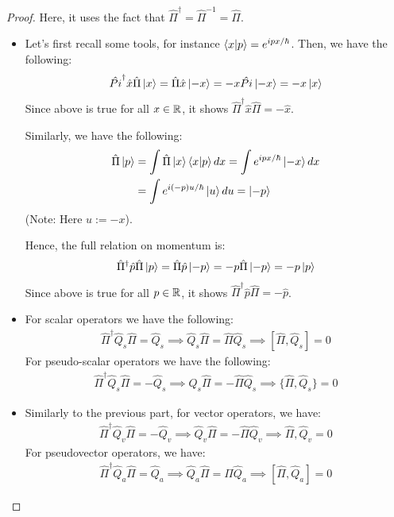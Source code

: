 \documentclass{article}
\begin{document}
\begin{proof}
    Here, it uses the fact that $\hat{\Pi}^\dagger=\hat{\Pi}^{-1}=\hat{\Pi}$.

    \hfil

    \begin{itemize}
        \item[(a)] Let's first recall some tools, for instance $\braket{x}{p}=e^{ipx/\hbar}$. Then, we have the following:
        \begin{align}
            \hat{Pi}^\dagger \hat{x} \hat{\Pi} \ket{x} = \hat{\Pi}\hat{x}\ket{-x} = -x\hat{Pi}\ket{-x} = -x\ket{x}
        \end{align}
        Since above is true for all $x\in\mathbb{R}$, it shows $\hat{\Pi}^\dagger\hat{x}\hat{\Pi}=-\hat{x}$.

        Similarly, we have the following:
        \begin{align}
            \hat{\Pi}\ket{p} &= \int \hat{\Pi}\ket{x}\braket{x}{p}dx = \int e^{ipx/\hbar}\ket{-x}dx\\
            &= \int e^{i(-p)u/\hbar}\ket{u}du = \ket{-p}
        \end{align}
        (Note: Here $u:=-x$).

        Hence, the full relation on momentum is:
        \begin{align}
            \hat{\Pi}^\dagger\hat{p}\hat{\Pi}\ket{p} = \hat{\Pi}\hat{p}\ket{-p} = -p\hat{\Pi}\ket{-p} = -p\ket{p}
        \end{align}
        Since above is true for all $p \in\mathbb{R}$, it shows $\hat{\Pi}^\dagger\hat{p}\hat{\Pi}=-\hat{p}$.

        \hfil

        \item[(b)] For scalar operators we have the following:
        \begin{align}
            \hat{\Pi}^\dagger \hat{Q}_s \hat{\Pi} = \hat{Q}_s \implies \hat{Q}_s \hat{\Pi} = \hat{\Pi}\hat{Q}_s \implies [\hat{\Pi},\hat{Q}_s]=0
        \end{align}
        For pseudo-scalar operators we have the following:
        \begin{align}
            \hat{\Pi}^\dagger\hat{Q}_s\hat{\Pi}=-\hat{Q}_s \implies \hat{Q}_s \hat{\Pi}=-\hat{\Pi}\hat{Q}_s \implies \{\hat{\Pi},\hat{Q}_s\}=0
        \end{align}

        \hfil

        \item[(c)] Similarly to the previous part, for vector operators, we have:
        \begin{align}
            \hat{\Pi}^\dagger\hat{Q}_v\hat{\Pi}=-\hat{Q}_v\implies \hat{Q}_v\hat{\Pi}=-\hat{\Pi}\hat{Q}_v \implies {\hat{\Pi},\hat{Q}_v}=0
        \end{align}
        For pseudovector operators, we have:
        \begin{align}
            \hat{\Pi}^\dagger\hat{Q}_a\hat{\Pi} = \hat{Q}_a \implies \hat{Q}_a\hat{\Pi}=\hat{\Pi}\hat{Q}_a \implies [\hat{\Pi},\hat{Q}_a]=0
        \end{align}


\end{itemize}
\end{proof}
\end{document}
